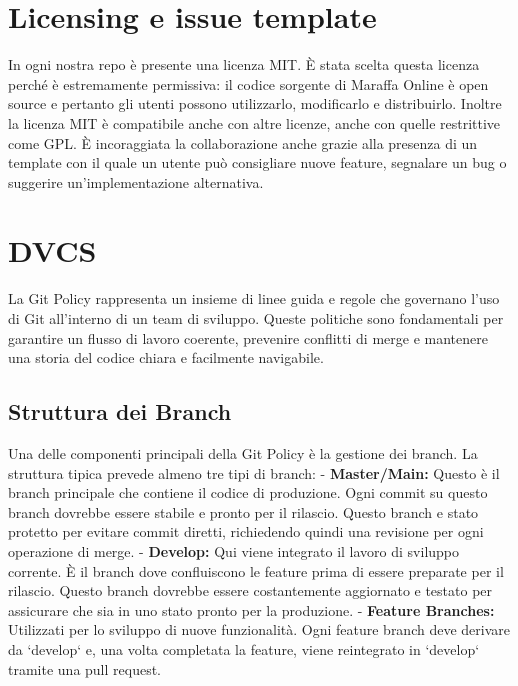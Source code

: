 \section{Licensing e issue template}
In ogni nostra repo è presente una licenza MIT. È stata scelta questa licenza perché è estremamente permissiva: 
il codice sorgente di Maraffa Online è open source e pertanto gli utenti possono utilizzarlo, modificarlo e distribuirlo.
Inoltre la licenza MIT è compatibile anche con altre licenze, anche con quelle restrittive come GPL.
È incoraggiata la collaborazione anche grazie alla presenza di un template con il quale un utente può consigliare nuove feature,
 segnalare un bug o suggerire un'implementazione alternativa.
\section{DVCS}

La Git Policy rappresenta un insieme di linee guida e regole che governano l'uso di Git all'interno di un team di sviluppo. 
Queste politiche sono fondamentali per garantire un flusso di lavoro coerente, prevenire conflitti di merge e mantenere una storia del codice chiara e facilmente navigabile. 

\subsection{Struttura dei Branch}

Una delle componenti principali della Git Policy è la gestione dei branch. La struttura tipica prevede almeno tre tipi di branch:
- \textbf{Master/Main:} Questo è il branch principale che contiene il codice di produzione. Ogni commit su questo branch dovrebbe essere stabile e pronto per il rilascio. Questo branch e stato protetto per evitare commit diretti, richiedendo quindi una revisione per ogni operazione di merge.
- \textbf{Develop:} Qui viene integrato il lavoro di sviluppo corrente. È il branch dove confluiscono le feature prima di essere preparate per il rilascio. Questo branch dovrebbe essere costantemente aggiornato e testato per assicurare che sia in uno stato pronto per la produzione.
- \textbf{Feature Branches:} Utilizzati per lo sviluppo di nuove funzionalità. Ogni feature branch deve derivare da `develop` e, una volta completata la feature, viene reintegrato in `develop` tramite una pull request.



